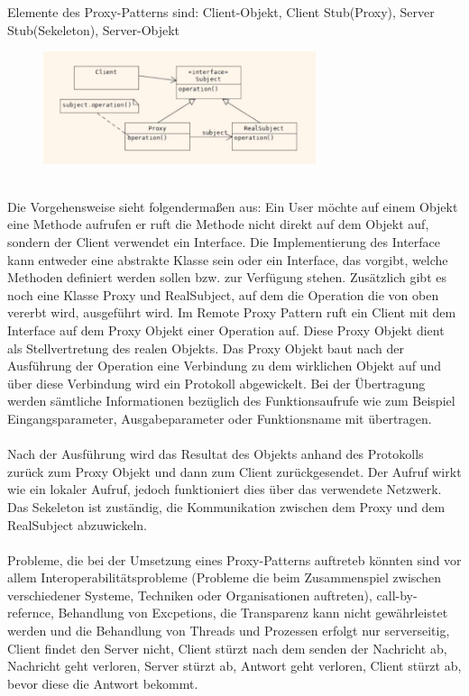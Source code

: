 \documentclass[a4paper,12pt]{article}
\begin{document}
Elemente des Proxy-Patterns sind: Client-Objekt, Client Stub(Proxy), Server Stub(Sekeleton), Server-Objekt\\
\begin{figure}[h]
    \centering
    \includegraphics[width=8cm]{ProxyPattern.png}
\end{figure}
\\
Die Vorgehensweise sieht folgendermaßen aus: Ein User möchte auf einem Objekt eine Methode aufrufen er ruft die Methode nicht direkt auf dem Objekt auf, sondern der Client verwendet ein Interface. Die Implementierung des Interface kann entweder eine abstrakte Klasse sein oder
ein Interface, das vorgibt, welche Methoden definiert werden sollen bzw. zur Verfügung stehen.
Zusätzlich gibt es noch eine Klasse Proxy und RealSubject, auf dem die Operation die von oben vererbt wird, ausgeführt wird. Im Remote Proxy Pattern ruft ein Client mit dem Interface auf dem Proxy Objekt einer Operation auf. Diese Proxy Objekt dient als Stellvertretung des realen Objekts. Das Proxy Objekt baut nach der Ausführung der Operation
eine Verbindung zu dem wirklichen Objekt auf und über diese Verbindung wird ein Protokoll abgewickelt. Bei der Übertragung werden sämtliche Informationen bezüglich des Funktionsaufrufe wie zum Beispiel Eingangsparameter, Ausgabeparameter oder Funktionsname mit übertragen. \\\\
Nach der Ausführung wird das Resultat des Objekts anhand des Protokolls zurück zum Proxy Objekt und dann zum Client zurückgesendet. Der Aufruf wirkt wie ein lokaler Aufruf, jedoch funktioniert dies über das verwendete Netzwerk.
Das Sekeleton ist zuständig, die Kommunikation zwischen dem Proxy und dem RealSubject abzuwickeln.\\\\
Probleme, die bei der Umsetzung eines Proxy-Patterns auftreteb könnten sind vor allem Interoperabilitätsprobleme (Probleme die beim Zusammenspiel zwischen verschiedener Systeme, Techniken oder Organisationen auftreten), call-by-refernce, Behandlung von Excpetions, die Transparenz kann nicht gewährleistet werden und die Behandlung von Threads und Prozessen erfolgt nur serverseitig, Client findet den Server nicht, Client stürzt nach dem senden der Nachricht ab, Nachricht geht verloren, Server stürzt ab, Antwort geht verloren, Client stürzt ab, bevor diese die Antwort bekommt.
\end{document}
